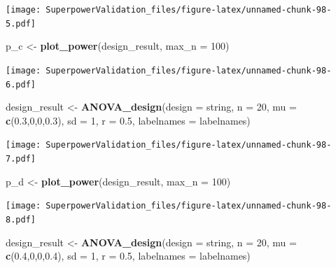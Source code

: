\documentclass[]{book}
\newenvironment{Shaded}{\begin{snugshade}}{\end{snugshade}}
\newcommand{\DataTypeTok}[1]{\textcolor[rgb]{0.13,0.29,0.53}{#1}}
\newcommand{\DecValTok}[1]{\textcolor[rgb]{0.00,0.00,0.81}{#1}}
\newcommand{\FloatTok}[1]{\textcolor[rgb]{0.00,0.00,0.81}{#1}}
\newcommand{\KeywordTok}[1]{\textcolor[rgb]{0.13,0.29,0.53}{\textbf{#1}}}
\newcommand{\NormalTok}[1]{#1}
\newcommand{\StringTok}[1]{\textcolor[rgb]{0.31,0.60,0.02}{#1}}
\begin{document}
\texttt{[image: SuperpowerValidation\_files/figure-latex/unnamed-chunk-98-5.pdf]}

\begin{Shaded}
\begin{Highlighting}[]
\NormalTok{p_c <-}\StringTok{ }\KeywordTok{plot_power}\NormalTok{(design_result,}
                      \DataTypeTok{max_n =} \DecValTok{100}\NormalTok{)}
\end{Highlighting}
\end{Shaded}

\texttt{[image: SuperpowerValidation\_files/figure-latex/unnamed-chunk-98-6.pdf]}

\begin{Shaded}
\begin{Highlighting}[]
\NormalTok{design_result <-}\StringTok{ }\KeywordTok{ANOVA_design}\NormalTok{(}\DataTypeTok{design =}\NormalTok{ string,}
                              \DataTypeTok{n =} \DecValTok{20}\NormalTok{, }
                              \DataTypeTok{mu =} \KeywordTok{c}\NormalTok{(}\FloatTok{0.3}\NormalTok{,}\DecValTok{0}\NormalTok{,}\DecValTok{0}\NormalTok{,}\FloatTok{0.3}\NormalTok{), }
                              \DataTypeTok{sd =} \DecValTok{1}\NormalTok{, }
                              \DataTypeTok{r =} \FloatTok{0.5}\NormalTok{, }
                              \DataTypeTok{labelnames =}\NormalTok{ labelnames)}
\end{Highlighting}
\end{Shaded}

\texttt{[image: SuperpowerValidation\_files/figure-latex/unnamed-chunk-98-7.pdf]}

\begin{Shaded}
\begin{Highlighting}[]
\NormalTok{p_d <-}\StringTok{ }\KeywordTok{plot_power}\NormalTok{(design_result,}
                      \DataTypeTok{max_n =} \DecValTok{100}\NormalTok{)}
\end{Highlighting}
\end{Shaded}

\texttt{[image: SuperpowerValidation\_files/figure-latex/unnamed-chunk-98-8.pdf]}

\begin{Shaded}
\begin{Highlighting}[]
\NormalTok{design_result <-}\StringTok{ }\KeywordTok{ANOVA_design}\NormalTok{(}\DataTypeTok{design =}\NormalTok{ string,}
                              \DataTypeTok{n =} \DecValTok{20}\NormalTok{, }
                              \DataTypeTok{mu =} \KeywordTok{c}\NormalTok{(}\FloatTok{0.4}\NormalTok{,}\DecValTok{0}\NormalTok{,}\DecValTok{0}\NormalTok{,}\FloatTok{0.4}\NormalTok{), }
                              \DataTypeTok{sd =} \DecValTok{1}\NormalTok{, }
                              \DataTypeTok{r =} \FloatTok{0.5}\NormalTok{, }
                              \DataTypeTok{labelnames =}\NormalTok{ labelnames)}
\end{Highlighting}
\end{Shaded}
\end{document}

